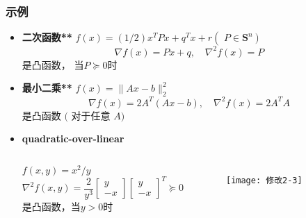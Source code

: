 \documentclass[handout,10pt]{beamer}
\begin{document}
\begin{frame}
	\frametitle{示例}
\begin{itemize}[<+->]
  \item \textbf{二次函数** } $f(x)=(1 / 2) x^{T} P x+q^{T} x+r\left(\right.$  $\left.P \in \mathbf{S}^{n}\right)$
	\begin{equation}
		\nabla f(x)=P x+q, \quad \nabla^{2} f(x)=P
	\end{equation}
    是凸函数， 当$P \succeq 0$时

  \item  \textbf{最小二乘**} $f(x)=\|A x-b\|_{2}^{2}$
    \begin{equation}
    	\nabla f(x)=2 A^{T}(A x-b), \quad \nabla^{2} f(x)=2 A^{T} A
    \end{equation}
    是凸函数 $($ 对于任意 $A)$


 \item \textbf{quadratic-over-linear}
    \begin{columns}
    	$f(x, y)=x^{2} / y$
    	\begin{equation}
    		\nabla^{2} f(x, y)=\frac{2}{y^{3}}\left[\begin{array}{c}
                 y \\
                 -x
                 \end{array}\right]
                 \left[\begin{array}{c}
                 y \\
                 -x
                 \end{array}\right]^{T} \succeq 0
    	\end{equation}
        是凸函数，当$y>0$时
    	\begin{figure}
    		\centering
    		\texttt{[image: 修改2-3]}
    	\end{figure}
    \end{columns}

\end{itemize}
	
\end{frame}
\end{document}

